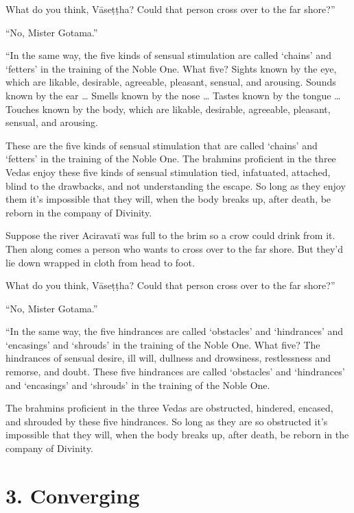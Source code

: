 \documentclass[12pt,openany]{book}%
\begin{document}
What do you think, \textsanskrit{Vāseṭṭha}? Could that person cross over to the far shore?” 

“No, Mister Gotama.” 

“In the same way, the five kinds of sensual stimulation are called ‘chains’ and ‘fetters’ in the training of the Noble One. What five? Sights known by the eye, which are likable, desirable, agreeable, pleasant, sensual, and arousing. Sounds known by the ear … Smells known by the nose … Tastes known by the tongue … Touches known by the body, which are likable, desirable, agreeable, pleasant, sensual, and arousing. 

These are the five kinds of sensual stimulation that are called ‘chains’ and ‘fetters’ in the training of the Noble One. The brahmins proficient in the three Vedas enjoy these five kinds of sensual stimulation tied, infatuated, attached, blind to the drawbacks, and not understanding the escape. So long as they enjoy them it’s impossible that they will, when the body breaks up, after death, be reborn in the company of Divinity. 

Suppose the river \textsanskrit{Aciravatī} was full to the brim so a crow could drink from it. Then along comes a person who wants to cross over to the far shore. But they’d lie down wrapped in cloth from head to foot. 

What do you think, \textsanskrit{Vāseṭṭha}? Could that person cross over to the far shore?” 

“No, Mister Gotama.” 

“In the same way, the five hindrances are called ‘obstacles’ and ‘hindrances’ and ‘encasings’ and ‘shrouds’ in the training of the Noble One. What five? The hindrances of sensual desire, ill will, dullness and drowsiness, restlessness and remorse, and doubt. These five hindrances are called ‘obstacles’ and ‘hindrances’ and ‘encasings’ and ‘shrouds’ in the training of the Noble One. 

The brahmins proficient in the three Vedas are obstructed, hindered, encased, and shrouded by these five hindrances. So long as they are so obstructed it’s impossible that they will, when the body breaks up, after death, be reborn in the company of Divinity. 

\section*{3. Converging }
\end{document}
